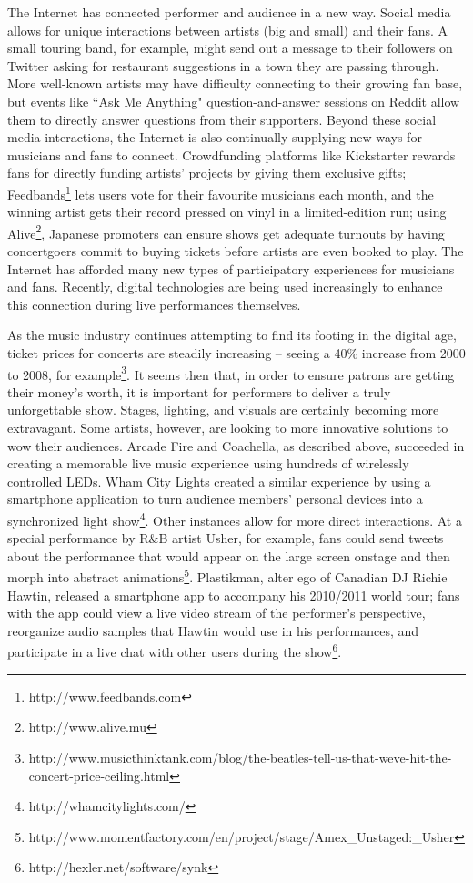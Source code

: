 The Internet has connected performer and audience in a new way. Social media allows for unique interactions between artists (big and small) and their fans. A small touring band, for example, might send out a message to their followers on Twitter asking for restaurant suggestions in a town they are passing through. More well-known artists may have difficulty connecting to their growing fan base, but events like ``Ask Me Anything" question-and-answer sessions on Reddit allow them to directly answer questions from their supporters. Beyond these social media interactions, the Internet is also continually supplying new ways for musicians and fans to connect. Crowdfunding platforms like Kickstarter rewards fans for directly funding artists' projects by giving them exclusive gifts; Feedbands\footnote{http://www.feedbands.com} lets users vote for their favourite musicians each month, and the winning artist gets their record pressed on vinyl in a limited-edition run; using Alive\footnote{http://www.alive.mu}, Japanese promoters can ensure shows get adequate turnouts by having concertgoers commit to buying tickets before artists are even booked to play. The Internet has afforded many new types of participatory experiences for musicians and fans. Recently, digital technologies are being used increasingly to enhance this connection during live performances themselves.

As the music industry continues attempting to find its footing in the digital age, ticket prices for concerts are steadily increasing -- seeing a 40\% increase from 2000 to 2008, for example\footnote{http://www.musicthinktank.com/blog/the-beatles-tell-us-that-weve-hit-the-concert-price-ceiling.html}. It seems then that, in order to ensure patrons are getting their money's worth, it is important for performers to deliver a truly unforgettable show. Stages, lighting, and visuals are certainly becoming more extravagant. Some artists, however, are looking to more innovative solutions to wow their audiences. Arcade Fire and Coachella, as described above, succeeded in creating a memorable live music experience using hundreds of wirelessly controlled LEDs. Wham City Lights created a similar experience by using a smartphone application to turn audience members' personal devices into a synchronized light show\footnote{http://whamcitylights.com/}. Other instances allow for more direct interactions. At a special performance by R\&B artist Usher, for example, fans could send tweets about the performance that would appear on the large screen onstage and then morph into abstract animations\footnote{http://www.momentfactory.com/en/project/stage/Amex\_Unstaged:\_Usher}. Plastikman, alter ego of Canadian DJ Richie Hawtin, released a smartphone app to accompany his 2010/2011 world tour; fans with the app could view a live video stream of the performer's perspective, reorganize audio samples that Hawtin would use in his performances, and participate in a live chat with other users during the show\footnote{http://hexler.net/software/synk}.

